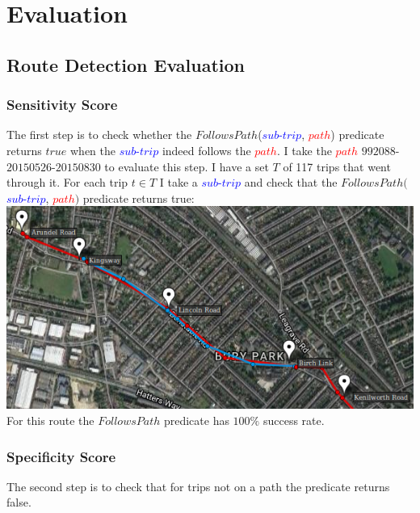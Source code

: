 \documentclass[12pt,a4paper,oneside,openright]{report}
\begin{document}
\chapter{Evaluation}

\section{Route Detection Evaluation}

\subsection{Sensitivity Score}

The first step is to check whether the 
$FollowsPath$(\textcolor{blue}{$sub$-$trip$}, \textcolor{red}{$path$})
predicate returns $true$ when the \textcolor{blue}{$sub$-$trip$} indeed
follows the \textcolor{red}{$path$}. I take the
\textcolor{red}{$path$} $992088$-$20150526$-$20150830$ to evaluate this step.
I have a set $T$ of 117 trips that went through it. For each trip
$t \in T$ I take a \textcolor{blue}{$sub$-$trip$} and check that the
$FollowsPath($\textcolor{blue}{$sub$-$trip$}, \textcolor{red}{$path$}$)$ 
predicate returns true: \\

\includegraphics[scale = 0.7]{figs/stop1.png} \\

For this route the $FollowsPath$ predicate has $100\%$ success rate.

\subsection{Specificity Score}

The second step is to check that for trips not on a path
the predicate returns false. \\
\end{document}
